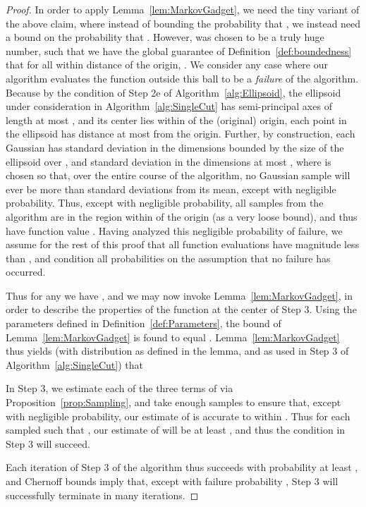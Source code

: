 \documentclass[11pt,letter]{article}
\numberwithin{nTheorems}{section}
\begin{document}
\begin{proof}
In order to apply Lemma~\ref{lem:MarkovGadget}, we need the tiny variant of the above claim, where instead of bounding the probability that , we instead need a bound on the probability that . However,  was chosen to be a truly huge number, such that we have the global guarantee of Definition~\ref{def:boundedness} that for all  within distance  of the origin, . We consider any case where our algorithm evaluates the function outside this ball to be a \emph{failure} of the algorithm. Because by the condition of Step 2e of Algorithm~\ref{alg:Ellipsoid}, the ellipsoid under consideration in Algorithm~\ref{alg:SingleCut} has semi-principal axes of length at most , and its center lies within  of the (original) origin, each point in the ellipsoid has distance at most  from the origin. Further, by construction, each Gaussian has standard deviation in the  dimensions bounded by the size of the ellipsoid over , and standard deviation in the  dimensions at most , where  is chosen so that, over the entire course of the algorithm, no Gaussian sample will ever be more than  standard deviations from its mean, except with negligible probability. Thus, except with negligible probability, all samples from the algorithm are in the region within  of the origin (as a very loose bound), and thus have function value . Having analyzed this negligible probability of failure, we assume for the rest of this proof that all function evaluations have magnitude less than , and condition all probabilities on the assumption that no failure has occurred.

Thus for any  we have , and
we may now invoke Lemma~\ref{lem:MarkovGadget}, in order to describe the properties of the function  at the center of Step 3. Using the parameters defined in Definition~\ref{def:Parameters}, the bound  of Lemma~\ref{lem:MarkovGadget} is found to equal . Lemma~\ref{lem:MarkovGadget} thus yields (with distribution  as defined in the lemma, and as used in Step 3 of Algorithm~\ref{alg:SingleCut}) that 

In Step 3, we estimate each of the three terms of  via Proposition~\ref{prop:Sampling}, and take enough samples to ensure that, except with negligible probability, our estimate of  is accurate to within . Thus for each sampled  such that , our estimate of  will be at least , and thus the condition in Step 3 will succeed.

Each iteration of Step 3 of the algorithm thus succeeds with probability at least , and Chernoff bounds imply that, except with failure probability , Step 3 will successfully terminate in  many iterations.


\end{proof}
\end{document}
